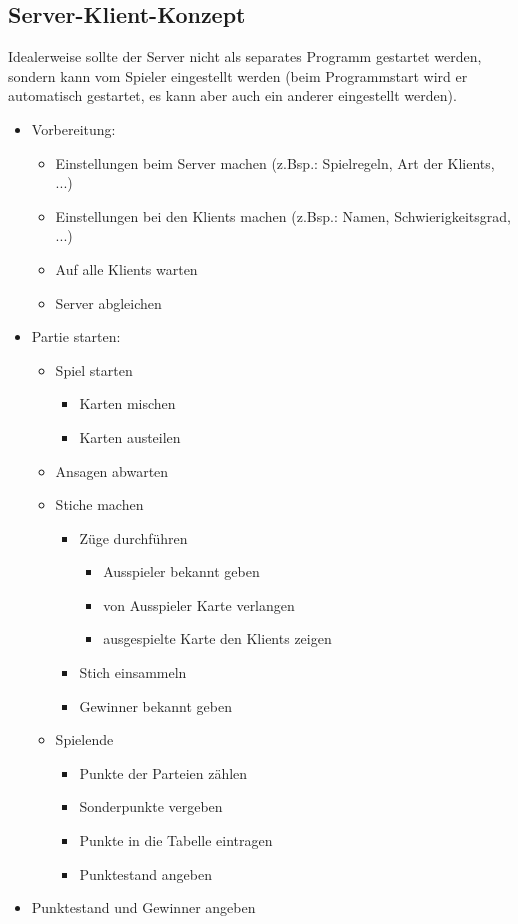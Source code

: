\documentclass[12pt,a4paper]{article}
\begin{document}
\subsection{Server-Klient-Konzept}
Idealerweise sollte der Server nicht als separates Programm gestartet werden, sondern kann vom Spieler eingestellt werden
(beim Programmstart wird er automatisch gestartet, es kann aber auch ein anderer eingestellt werden).
\begin{itemize}
\item Vorbereitung:
\begin{itemize}
\item Einstellungen beim Server machen (z.Bsp.: Spielregeln, Art der Klients, ...)
\item Einstellungen bei den Klients machen (z.Bsp.: Namen, Schwierigkeitsgrad, ...)
\item Auf alle Klients warten
\item Server abgleichen
\end{itemize}
\item Partie starten:
\begin{itemize}
\item Spiel starten
\begin{itemize}
\item Karten mischen
\item Karten austeilen
\end{itemize}
\item Ansagen abwarten
\item Stiche machen
\begin{itemize}
\item Züge durchführen
\begin{itemize}
\item Ausspieler bekannt geben
\item von Ausspieler Karte verlangen
\item ausgespielte Karte den Klients zeigen
\end{itemize}
\item Stich einsammeln
\item Gewinner bekannt geben
\end{itemize}
\item Spielende
\begin{itemize}
\item Punkte der Parteien zählen
\item Sonderpunkte vergeben
\item Punkte in die Tabelle eintragen
\item Punktestand angeben
\end{itemize}
\end{itemize}
\item Punktestand und Gewinner angeben
\end{itemize}
\end{document}
